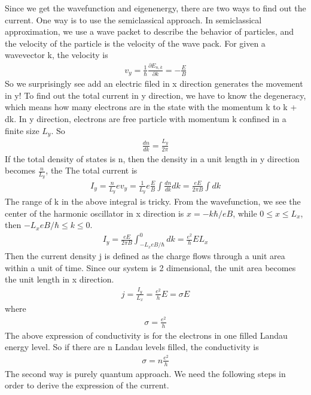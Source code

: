 \documentclass[a4paper]{article}
\begin{document}
Since we get the wavefunction and eigenenergy, there are two ways to find out the current. One way is to use the semiclassical approach. In semiclassical approximation, we use a wave packet to describe the behavior of particles, and the velocity of the particle is the velocity of the wave pack. For given a wavevector k, the velocity is
\begin{align*}
	v_y = \frac{1}{\hbar} \frac{\partial E_{n,k}}{\partial k} = -\frac{E}{B}
\end{align*}
So we surprisingly see add an electric filed in x direction generates the movement in y!
To find out the total current in y direction, we have to know the degeneracy, which means how many electrons are in the state with the momentum k to k + dk. In y direction, electrons are free particle with momentum k confined in a finite size $L_y$. So
\begin{align*}
	\frac{dn}{dk} = \frac{L_y}{2 \pi}
\end{align*}
If the total density of states is n, then the density in a unit length in y direction becomes $\frac{n}{L_y}$, the The total current is
\begin{align*}
	I_y = \frac{n}{L_y} e v_y =\frac{1}{L_y}e \frac{E}{B} \int \frac{dn}{dk}dk = \frac{eE}{2\pi B} \int dk
\end{align*}
The range of k in the above integral is tricky. From the wavefunction, we see the center of the harmonic oscillator in x direction is $x = -k\hbar/eB$, while $ 0 \leq x \leq L_x$, then $-L_x eB/\hbar  \leq k \leq 0$.
\begin{align*}
	I_y = \frac{eE}{2\pi B} \int_{-L_xeB/\hbar}^0 dk = \frac{e^2}{h}EL_x
\end{align*}
Then the current density j is defined as the charge flows through a unit area within a unit of time. Since our system is 2 dimensional, the unit area becomes the unit length in x direction.
\begin{align*}
	j = \frac{I_y}{L_x} = \frac{e^2}{h}E = \sigma E
\end{align*}
where 
\begin{align*}
	\sigma = \frac{e^2}{h}
\end{align*}
The above expression of conductivity is for the electrons in one filled Landau energy level. So if there are n Landau levels filled, the conductivity is
\begin{align*}
	\sigma = n\frac{e^2}{h}
\end{align*}
The second way is purely quantum approach. We need the following steps in order to derive the expression of the current. 
\end{document}
